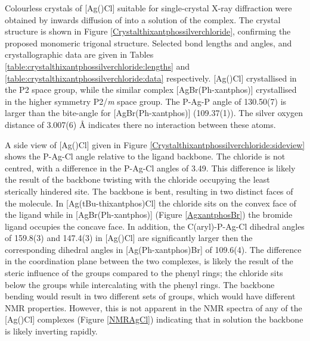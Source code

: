 Colourless crystals of [Ag(\tButhixantphos)Cl] suitable for single-crystal X-ray diffraction were obtained by inwards diffusion of  into a  solution of the complex.  The crystal structure is shown in Figure \ref{Crystalthixantphossilverchloride}, confirming the proposed monomeric trigonal structure.  Selected bond lengths and angles, and crystallographic data are given in Tables \ref{table:crystalthixantphossilverchloride:lengths} and \ref{table:crystalthixantphossilverchloride:data} respectively.  [Ag(\tButhixantphos)Cl] crystallised in the P2 space group, while the similar complex [AgBr(Ph-xantphos)] crystallised in the higher symmetry P2/\emph{m} space group.\cite{Kaltzoglou2007}  The P-Ag-P angle of 130.50(7)\degrees{} is larger than the bite-angle for [AgBr(Ph-xantphos)] (109.37(1)\degrees{}).  The silver oxygen distance of 3.007(6) \si{\angstrom} indicates there no interaction between these atoms.

A side view of [Ag(\tButhixantphos)Cl] given in Figure \ref{Crystalthixantphossilverchloride:sideview} shows the P-Ag-Cl angle relative to the ligand backbone.   The chloride is not centred, with a difference in the P-Ag-Cl angles of 3.49\degrees.  This difference is likely the result of the backbone twisting with the chloride occupying the least sterically hindered site.  The backbone is bent, resulting in two distinct faces of the molecule.  In [Ag(tBu-thixantphos)Cl] the chloride sits on the convex face of the ligand while in [AgBr(Ph-xantphos)] (Figure \ref{AgxantphosBr}) the bromide ligand occupies the concave face.\cite{Kaltzoglou2007}  In addition, the C(aryl)-P-Ag-Cl dihedral angles of 159.8(3)\degrees{} and 147.4(3)\degrees{} in [Ag(\tButhixantphos)Cl] are significantly larger then the corresponding dihedral angles in [Ag(Ph-xantphos)Br] of 109.6(4)\degrees{}.  The difference in the coordination plane between the two complexes, is likely the result of the steric influence of the \tBu{} groups compared to the phenyl rings; the chloride sits below the \tBu{} groups while intercalating with the phenyl rings.  The backbone bending would result in two different sets of \tBu{} groups, which would have different NMR properties.  However, this is not apparent in the NMR spectra of any of the [Ag(\tBuxantphos)Cl] complexes (Figure \ref{NMRAgCl}) indicating that in solution the backbone is likely inverting rapidly.  


